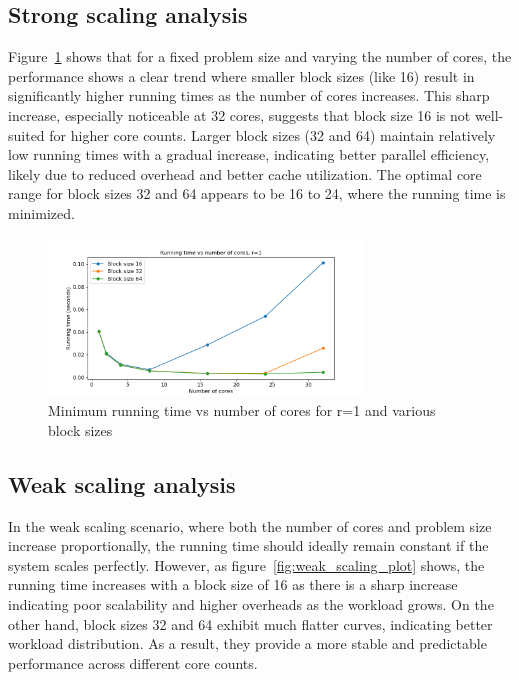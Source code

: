 \documentclass[a4paper,%
7pt,%
DIV12,
headsepline,%
headings=normal,
]{scrartcl}
\begin{document}
\subsection{Strong scaling analysis}

Figure~\ref{fig:strong_scaling_plot} shows that for a fixed problem size and varying the number of cores, the performance shows a clear trend where smaller block sizes (like 16) result in significantly higher running times as the number of cores increases. This sharp increase, especially noticeable at 32 cores, suggests that block size 16 is not well-suited for higher core counts. Larger block sizes (32 and 64) maintain relatively low running times with a gradual increase, indicating better parallel efficiency, likely due to reduced overhead and better cache utilization.  The optimal core range for block sizes 32 and 64 appears to be 16 to 24, where the running time is minimized.

\begin{figure}[htbp]
    \centering
    \includegraphics[width=0.75\textwidth]{./strong_scaling_plot.png}
    \caption{Minimum running time vs number of cores for r=1 and various block sizes}
    \label{fig:strong_scaling_plot}
\end{figure}

\subsection{Weak scaling analysis}

In the weak scaling scenario, where both the number of cores and problem size increase proportionally, the running time should ideally remain constant if the system scales perfectly. However, as figure~\ref{fig:weak_scaling_plot} shows, the running time increases with a block size of 16 as there is a sharp increase indicating poor scalability and higher overheads as the workload grows. On the other hand, block sizes 32 and 64 exhibit much flatter curves, indicating better workload distribution. As a result, they provide a more stable and predictable performance across different core counts. 
\end{document}
